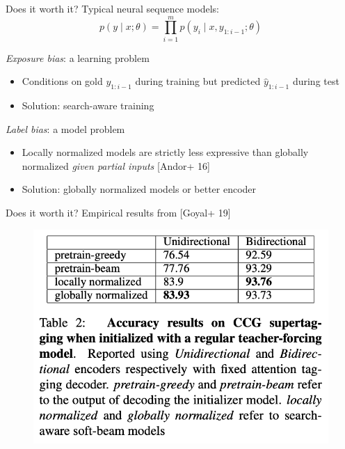 \documentclass[usenames,dvipsnames,notes]{beamer}
\begin{document}
\begin{frame}
    {Does it worth it?}
    Typical neural sequence models:
    $$
    p(y\mid x;\theta) = \prod_{i=1}^m p(y_i\mid x, y_{1:i-1};\theta)
    $$

    \emph{Exposure bias}: a learning problem\\
    \begin{itemize}
        \item Conditions on gold $y_{1:i-1}$ during training but predicted $\hat{y}_{1:i-1}$ during test
        \item Solution: search-aware training
    \end{itemize}

    \emph{Label bias}: a model problem\\
    \begin{itemize}
        \item Locally normalized models are strictly less expressive than globally normalized \textit{given partial inputs} [Andor+ 16]
        \item Solution: globally normalized models or better encoder
    \end{itemize}

\end{frame}

\begin{frame}
    {Does it worth it?}
    Empirical results from [Goyal+ 19]
    \begin{figure}
        \includegraphics[scale=0.3]{figures/global-local-paper}
    \end{figure}
\end{frame}
\end{document}
